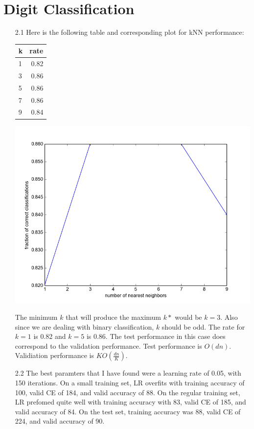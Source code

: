 \documentclass[letterpaper, 12pt]{article}
\begin{document}
\section*{Digit Classification}
\begin{itemize}
	\item[2.1]
		Here is the following table and corresponding plot for kNN performance: \\
		\begin{center}
			\begin{tabular}{ l | r }
				k &rate\\
				\hline
				1 &0.82\\
				3 &0.86\\
				5 &0.86\\
				7 &0.86\\
				9 &0.84
			\end{tabular}
		\end{center}
		\begin{center}
			\includegraphics[scale=0.25]{figure_1.png}
		\end{center}

		The minimum $k$ that will produce the maximum $k*$ would be $k = 3$. Also since we are dealing with binary classification, $k$ should be odd. The rate for $k = 1$ is 0.82 and $k = 5$ is 0.86. The test performance in this case does correspond to the validation performance. Test performance is $O(dn)$. Validiation performance is $KO(\frac{dn}{K})$.

	\item[2.2]
		The best paramters that I have found were a learning rate of 0.05, with 150 iterations. On a small training set, LR overfits with training accuracy of 100, valid CE of 184, and valid accuracy of 88. On the regular training set, LR prefomed quite well with training accuracy with 83, valid CE of 185, and valid accuracy of 84. On the test set, training accuracy was 88, valid CE of 224, and valid accuracy of 90. \\


\end{itemize}
\end{document}
